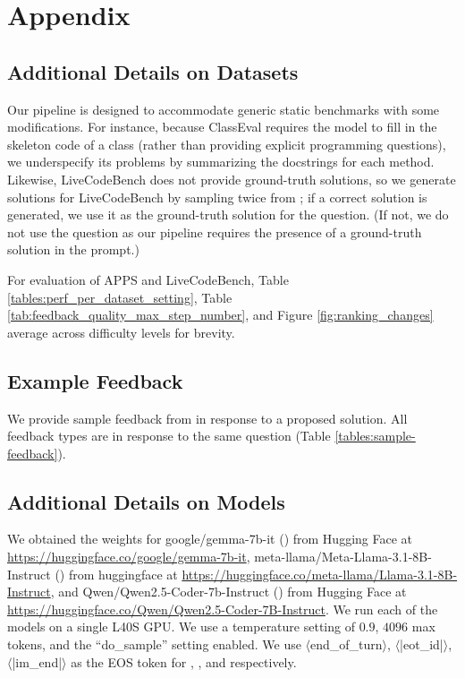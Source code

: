 \newpage
\section{Appendix}
\label{sec:appendix}



\subsection{Additional Details on Datasets}
\label{app:datasets}
Our pipeline is designed to accommodate generic static benchmarks with some modifications. 
For instance, because ClassEval requires the model to fill in the skeleton code of a class (rather than providing explicit programming questions), we underspecify its problems by summarizing the docstrings for each method.
Likewise, LiveCodeBench does not provide ground-truth solutions, so we generate solutions for LiveCodeBench by sampling twice from \sonnet{}; if a correct solution is generated, we use it as the ground-truth solution for the question. 
(If not, we do not use the question as our pipeline requires the presence of a ground-truth solution in the \user{} prompt.)  

For evaluation of APPS and LiveCodeBench, Table \ref{tables:perf_per_dataset_setting}, Table \ref{tab:feedback_quality_max_step_number}, and Figure \ref{fig:ranking_changes} average across difficulty levels for brevity.

\subsection{Example Feedback}
\label{app:feedback}


We provide sample feedback from \sonnet{} in response to a proposed solution. All feedback types are in response to the same question (Table \ref{tables:sample-feedback}).


\subsection{Additional Details on Models}\label{app:models}

We obtained the weights for google/gemma-7b-it (\gemmaSmall{}) from Hugging Face at \url{https://huggingface.co/google/gemma-7b-it}, meta-llama/Meta-Llama-3.1-8B-Instruct (\llama{}) from huggingface at \url{https://huggingface.co/meta-llama/Llama-3.1-8B-Instruct}, and Qwen/Qwen2.5-Coder-7b-Instruct (\qwenSmall{}) from Hugging Face at \url{https://huggingface.co/Qwen/Qwen2.5-Coder-7B-Instruct}. 
We run each of the models on a single L40S GPU. We use a temperature setting of $0.9$, $4096$ max tokens, and the ``do\_sample'' setting enabled. 
We use $\langle$end\_of\_turn$\rangle$, $\langle$|eot\_id|$\rangle$, $\langle$|im\_end|$\rangle$ as the EOS token for \gemmaSmall{}, \llama{}, and \qwenSmall{} respectively.


